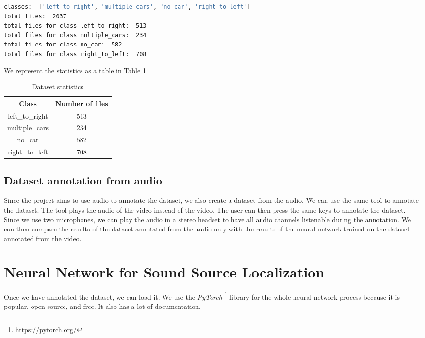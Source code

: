 \begin{lstlisting}[language=bash]
classes:  ['left_to_right', 'multiple_cars', 'no_car', 'right_to_left']
total files:  2037
total files for class left_to_right:  513
total files for class multiple_cars:  234
total files for class no_car:  582
total files for class right_to_left:  708
\end{lstlisting}

We represent the statistics as a table in Table \ref{tab:dataset_statistics}.

\begin{table}[H]
    \centering
    \begin{tabular}{|c|c|}
        \hline
        \textbf{Class} & \textbf{Number of files} \\
        \hline
        left\_to\_right & 513 \\
        \hline
        multiple\_cars & 234 \\
        \hline
        no\_car & 582 \\
        \hline
        right\_to\_left & 708 \\
        \hline
    \end{tabular}
    \caption{Dataset statistics}
    \label{tab:dataset_statistics}
\end{table}

\subsection{Dataset annotation from audio}

Since the project aims to use audio to annotate the dataset, we also create a dataset from the audio. We can use the same tool to annotate the dataset. The tool plays the audio of the video instead of the video. The user can then press the same keys to annotate the dataset. Since we use two microphones, we can play the audio in a stereo headset to have all audio channels listenable during the annotation. We can then compare the results of the dataset annotated from the audio only with the results of the neural network trained on the dataset annotated from the video. 

\section{Neural Network for Sound Source Localization}

Once we have annotated the dataset, we can load it. We use the \textit{PyTorch} \footnote{\url{https://pytorch.org/}} library for the whole neural network process because it is popular, open-source, and free. It also has a lot of documentation. 

